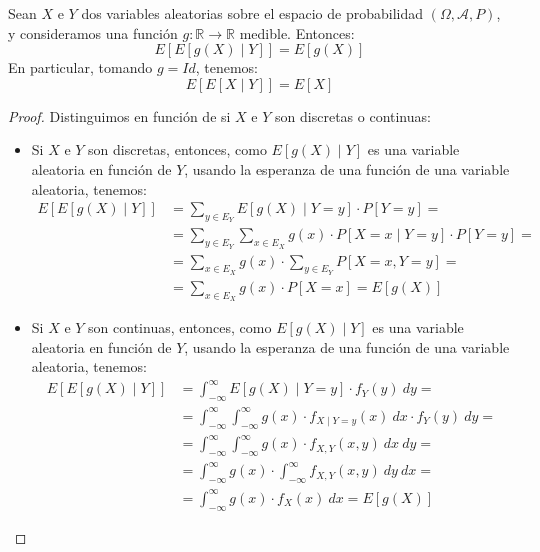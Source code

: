 \begin{prop}
    Sean $X$ e $Y$ dos variables aleatorias sobre el espacio de probabilidad $(\Omega, \mathcal{A}, P)$, y consideramos una función $g:\mathbb{R}\to\mathbb{R}$ medible. Entonces:
    \begin{equation*}
        E[E[g(X)\mid Y]] = E[g(X)]
    \end{equation*}
    En particular, tomando $g=Id$, tenemos:
    \begin{equation*}
        E[E[X\mid Y]] = E[X]
    \end{equation*}
\end{prop}
\begin{proof}
    Distinguimos en función de si $X$ e $Y$ son discretas o continuas:
    \begin{itemize}
        \item Si $X$ e $Y$ son discretas, entonces, como $E[g(X)\mid Y]$ es una variable aleatoria en función de $Y$, usando la esperanza de una función de una variable aleatoria, tenemos:
        \begin{align*}
            E[E[g(X)\mid Y]] &= \sum_{y\in E_Y} E[g(X)\mid Y = y]\cdot P[Y = y] =\\&= \sum_{y\in E_Y} \sum_{x\in E_X} g(x)\cdot P[X = x\mid Y = y]\cdot P[Y = y] =\\&= \sum_{x\in E_X} g(x)\cdot \sum_{y\in E_Y} P[X = x, Y = y] =\\&= \sum_{x\in E_X} g(x)\cdot P[X = x] = E[g(X)]
        \end{align*}

        \item Si $X$ e $Y$ son continuas, entonces, como $E[g(X)\mid Y]$ es una variable aleatoria en función de $Y$, usando la esperanza de una función de una variable aleatoria, tenemos:
        \begin{align*}
            E[E[g(X)\mid Y]] &= \int_{-\infty}^{\infty} E[g(X)\mid Y = y]\cdot f_Y(y)~dy =\\&= \int_{-\infty}^{\infty} \int_{-\infty}^{\infty} g(x)\cdot f_{X\mid Y=y}(x)~dx\cdot f_Y(y)~dy =\\&= \int_{-\infty}^{\infty} \int_{-\infty}^{\infty} g(x)\cdot f_{X,Y}(x,y)~dx~dy =\\&= \int_{-\infty}^{\infty} g(x)\cdot \int_{-\infty}^{\infty} f_{X,Y}(x,y)~dy~dx =\\&= \int_{-\infty}^{\infty} g(x)\cdot f_X(x)~dx = E[g(X)]
        \end{align*}
    \end{itemize}
\end{proof}

